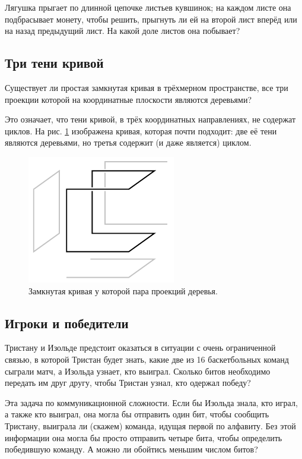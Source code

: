 Лягушка прыгает по длинной цепочке листьев кувшинок;
на каждом листе она подбрасывает монету, чтобы решить, прыгнуть ли ей на второй лист вперёд или на назад предыдущий лист.
На какой доле листов она побывает?

\subsection*{Три тени кривой}\label{Три тени кривой}

Существует ли простая замкнутая кривая в трёхмерном пространстве, все три проекции которой на координатные плоскости являются деревьями?

Это означает, что тени кривой, в трёх координатных направлениях, не содержат циклов.
На рис. \ref{pic:proj1} изображена кривая, которая почти подходит: две её тени являются деревьями, но третья содержит (и даже является) циклом.

\begin{figure}[htb!]
\centering
\includegraphics[scale=1]{pics/proj1}
\caption{Замкнутая кривая у которой пара проекций деревья.}
\label{pic:proj1}
\end{figure}

\subsection*{Игроки и победители}

Тристану и Изольде предстоит оказаться в ситуации с очень ограниченной связью, в которой Тристан будет знать, какие две из 16 баскетбольных команд сыграли матч, а Изольда узнает, кто выиграл.
Сколько битов необходимо передать им друг другу, чтобы Тристан узнал, кто одержал победу?

Эта задача по коммуникационной сложности.
Если бы Изольда знала, кто играл, а также кто выиграл, она могла бы отправить один бит, чтобы сообщить Тристану, выиграла ли (скажем) команда, идущая первой по алфавиту.
Без этой информации она могла бы просто отправить четыре бита, чтобы определить победившую команду.
А можно ли обойтись меньшим числом битов?

